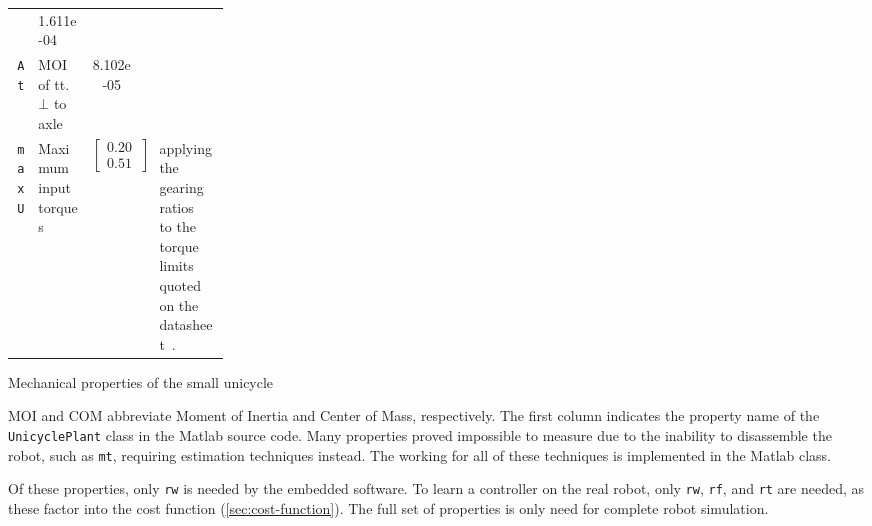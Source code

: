 {\begin{tabularx}{\linewidth}{
	@{}
	r
	>{\raggedright}p{0.25\linewidth}
	S[
		scientific-notation = engineering,
		table-format=-3e-1,
		table-auto-round
	]
	s
	X
	@{}
}
		& 1.611e-04 & \kilogram \square\meter
		&
	\\
	\texttt{At}
		& MOI of tt. $\bot$ to axle
		& 8.102e-05 & \kilogram \square\meter
		& 
	\\
\midrule
	\texttt{maxU}
		& Maximum input torques
		& {
			\renewcommand{\arraystretch}{1}
			$\begin{bmatrix}0.205 \\ 0.513\end{bmatrix}$
		} & \newton \meter
		& applying the gearing ratios~\cite{gearbox} to the torque limits quoted on the datasheet~\cite{motor}.
	\\
\bottomrule
\end{tabularx}
}

\centering
\caption{Mechanical properties of the small unicycle}
\medskip
\small
MOI and COM abbreviate Moment of Inertia and Center of Mass, respectively.
The first column indicates the property name of the \texttt{UnicyclePlant} class in the Matlab source code.
Many properties proved impossible to measure due to the inability to disassemble the robot, such as \texttt{mt}, requiring estimation techniques instead.
The working for all of these techniques is implemented in the Matlab  class.

\medskip
Of these properties, only \texttt{rw} is needed by the embedded software.
To learn a controller on the real robot, only \texttt{rw}, \texttt{rf}, and \texttt{rt} are needed, as these factor into the cost function (\cref{sec:cost-function}).
The full set of properties is only need for complete robot simulation.

